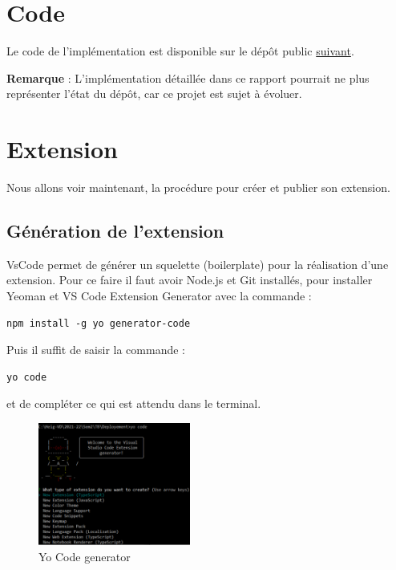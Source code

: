 \documentclass[
    iict, %
    il, %
]{heig-tb}
\begin{document}
\section{Code}
Le code de l'implémentation est disponible sur le dépôt public \href{https://github.com/vitorva/vscode-uon}{suivant}.

\textbf{Remarque} : L'implémentation détaillée dans ce rapport pourrait ne plus représenter l'état du dépôt, car ce projet est sujet à évoluer.

\section{Extension}
Nous allons voir maintenant, la procédure pour créer et publier son extension.

\subsection{Génération de l'extension}
VsCode permet de générer un squelette (boilerplate) pour la réalisation d'une extension. Pour ce faire il faut avoir Node.js et Git installés, pour installer Yeoman et VS Code Extension Generator avec la commande :

\begin{lstlisting}[caption={generator-code},label={generator-code}]
npm install -g yo generator-code
\end{lstlisting}

Puis il suffit de saisir la commande :

\begin{lstlisting}
yo code
\end{lstlisting}

et de compléter ce qui est attendu dans le terminal.

\begin{figure}[!ht]
    \begin{center}
        \includegraphics[width=5cm]{assets/figures/yo-code.png}
    \end{center}
    \caption[Yo Code generator]{\label{yo-code}Yo Code generator}
\end{figure}
\end{document}
